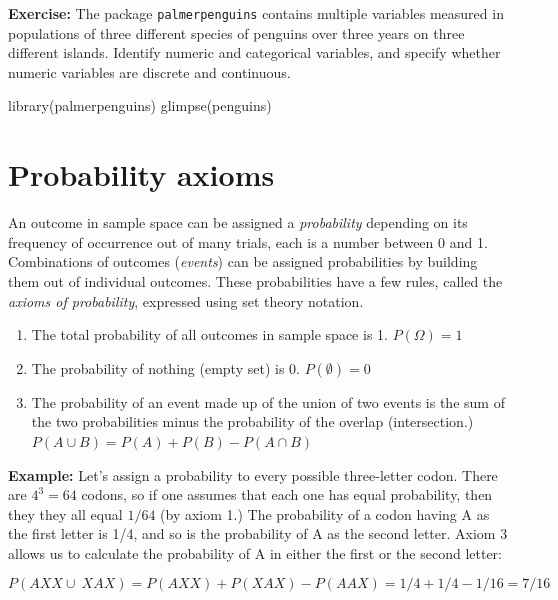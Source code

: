 \documentclass[
  letterpaper,
  DIV=11,
  numbers=noendperiod]{scrreprt}
\newenvironment{Shaded}{\begin{snugshade}}{\end{snugshade}}
\newcommand{\NormalTok}[1]{\textcolor[rgb]{0.00,0.23,0.31}{#1}}
\begin{document}
\textbf{Exercise:} The package \texttt{palmerpenguins} contains multiple
variables measured in populations of three different species of penguins
over three years on three different islands. Identify numeric and
categorical variables, and specify whether numeric variables are
discrete and continuous.

\begin{Shaded}
\begin{Highlighting}[]
\NormalTok{library(palmerpenguins)}
\NormalTok{glimpse(penguins)}
\end{Highlighting}
\end{Shaded}

\section{Probability axioms}\label{probability-axioms}

An outcome in sample space can be assigned a \emph{probability}
depending on its frequency of occurrence out of many trials, each is a
number between 0 and 1. Combinations of outcomes (\emph{events}) can be
assigned probabilities by building them out of individual outcomes.
These probabilities have a few rules, called the \emph{axioms of
probability}, expressed using set theory notation.

\begin{enumerate}
\def\labelenumi{\arabic{enumi}.}
\item
  The total probability of all outcomes in sample space is 1.
  \(P(\Omega) = 1\)
\item
  The probability of nothing (empty set) is 0. \(P(\emptyset) = 0\)
\item
  The probability of an event made up of the union of two events is the
  sum of the two probabilities minus the probability of the overlap
  (intersection.) \(P(A \cup B) = P(A) + P(B) - P(A \cap B)\)
\end{enumerate}

\textbf{Example:} Let's assign a probability to every possible
three-letter codon. There are \(4^3 = 64\) codons, so if one assumes
that each one has equal probability, then they they all equal \(1/64\)
(by axiom 1.) The probability of a codon having A as the first letter is
1/4, and so is the probability of A as the second letter. Axiom 3 allows
us to calculate the probability of A in either the first or the second
letter:

\[ P(AXX \cup \ XAX ) =  P(AXX) + P(XAX) - P(AAX) = 1/4 + 1/4 - 1/16 = 7/16\]
\end{document}
